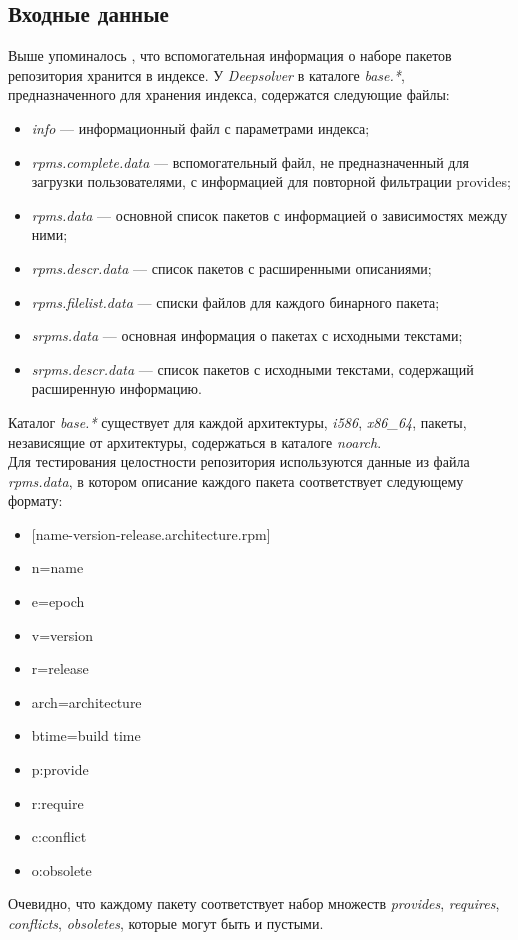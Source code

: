 \subsection{Входные данные}
Выше упоминалось , что вспомогательная информация о наборе пакетов репозитория
хранится в индексе. У \textit{Deepsolver} в каталоге \textit{base.*}, предназначенного для хранения индекса,
содержатся следующие файлы:\\
\begin{itemize}
\item{\textit{info} --- информационный файл с параметрами индекса;} 
\item{\textit{rpms.complete.data} --- вспомогательный файл, не предназначенный
для загрузки пользователями, с информацией для повторной фильтрации
provides;}
\item{\textit{rpms.data} --- основной список пакетов с информацией о зависимостях между ними;}
\item{\textit{rpms.descr.data} --- список пакетов с расширенными описаниями;}
\item{\textit{rpms.filelist.data} --- списки файлов для каждого бинарного пакета;}
\item{\textit{srpms.data} --- основная информация о пакетах с исходными текстами;}
\item{\textit{srpms.descr.data} --- список пакетов с исходными текстами, содержащий
расширенную информацию.}
\end{itemize} 
Каталог  \textit{base.*} существует для каждой архитектуры, \textit{i586}, \textit{x86\_64}, пакеты,
независящие от архитектуры, содержаться в каталоге \textit{noarch}.\\


Для тестирования целостности репозитория используются данные из файла \textit{rpms.data},
в котором описание каждого пакета соответствует следующему формату:
\begin{itemize}
\item{[name-version-release.architecture.rpm] }
\item{n=name} %
\item{e=epoch}
\item{v=version}
\item{r=release}
\item{arch=architecture}
\item{btime=build time}
\item{p:provide}
\item{r:require}
\item{c:conflict}
\item{o:obsolete}
\end{itemize}
Очевидно, что каждому пакету соответствует набор множеств \textit{provides},
\textit{requires}, \textit{conflicts}, \textit{obsoletes}, которые могут быть и пустыми.\\

